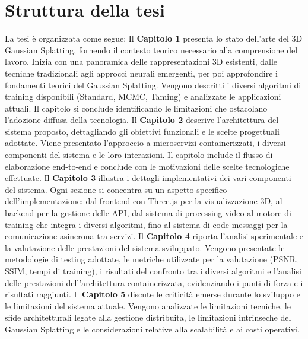 \section*{Struttura della tesi}
\label{sec:struttura}

La tesi è organizzata come segue:
\newline
\newline
Il \textbf{Capitolo 1} presenta lo stato dell'arte del 3D Gaussian Splatting, fornendo il contesto teorico necessario alla comprensione del lavoro. Inizia con una panoramica delle rappresentazioni 3D esistenti, dalle tecniche tradizionali agli approcci neurali emergenti, per poi approfondire i fondamenti teorici del Gaussian Splatting. Vengono descritti i diversi algoritmi di training disponibili (Standard, MCMC, Taming) e analizzate le applicazioni attuali. Il capitolo si conclude identificando le limitazioni che ostacolano l'adozione diffusa della tecnologia.
\newline
\newline
Il \textbf{Capitolo 2} descrive l'architettura del sistema proposto, dettagliando gli obiettivi funzionali e le scelte progettuali adottate. Viene presentato l'approccio a microservizi containerizzati, i diversi componenti del sistema e le loro interazioni. Il capitolo include il flusso di elaborazione end-to-end e conclude con le motivazioni delle scelte tecnologiche effettuate.
\newline
\newline
Il \textbf{Capitolo 3} illustra i dettagli implementativi dei vari componenti del sistema. Ogni sezione si concentra su un aspetto specifico dell'implementazione: dal frontend con Three.js per la visualizzazione 3D, al backend per la gestione delle API, dal sistema di processing video al motore di training che integra i diversi algoritmi, fino al sistema di code messaggi per la comunicazione asincrona tra servizi.
\newline
\newline
Il \textbf{Capitolo 4} riporta l'analisi sperimentale e la valutazione delle prestazioni del sistema sviluppato. Vengono presentate le metodologie di testing adottate, le metriche utilizzate per la valutazione (PSNR, SSIM, tempi di training), i risultati del confronto tra i diversi algoritmi e l'analisi delle prestazioni dell'architettura containerizzata, evidenziando i punti di forza e i risultati raggiunti.
\newline
\newline
Il \textbf{Capitolo 5} discute le criticità emerse durante lo sviluppo e le limitazioni del sistema attuale. Vengono analizzate le limitazioni tecniche, le sfide architetturali legate alla gestione distribuita, le limitazioni intrinseche del Gaussian Splatting e le considerazioni relative alla scalabilità e ai costi operativi.
